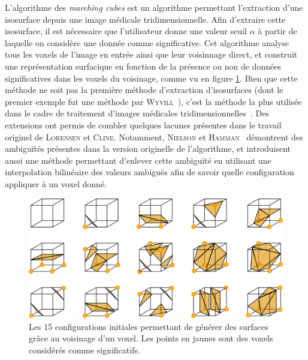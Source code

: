 {{{            L'algorithme des \textit{marching cubes} est un algorithme permettant l'extraction d'une isosurface depuis une image médicale tridimensionnelle. Afin d'extraire cette isosurface, il est nécessaire que l'utilisateur donne une valeur seuil $\alpha$ à partir de laquelle on considère une donnée comme \og{}significative\fg. Cet algorithme analyse tous les voxels de l'image en entrée ainsi que leur voisinnage direct, et construit une représentation surfacique en fonction de la présence ou non de données significatives dans les voxels du voisinage, comme vu en figure \ref{img:marching_cubes_configs}. Bien que cette méthode ne soit pas la première méthode d'extraction d'isosurfaces (dont le premier exemple fut une méthode par \textsc{Wyvill}~\cite{cite_wyvill_cubes}), c'est la méthode la plus utilisée dans le cadre de traitement d'images médicales tridimensionnelles~\cite{cite_marching_cubes_popularity}. Des extensions ont permis de combler quelques lacunes présentes dans le travail originel de \textsc{Lorensen} et \textsc{Cline}. Notamment, \textsc{Nielson} et \textsc{Hamman}~\cite{cite_marching_cubes_uncertainty} démontrent des ambiguïtés présentes dans la version originelle de l'algorithme, et introduisent aussi une méthode permettant d'enlever cette ambiguïté en utilisant une interpolation bilinéaire des valeurs ambiguës afin de savoir quelle configuration appliquer à un voxel donné.

            \begin{figure}[h]
                \centering
                \includegraphics[width=.8\linewidth]{img/marching_cubes_topology.png}
                \captionsetup{width=.8\linewidth}
                \caption{Les 15 configurations initiales permettant de générer des surfaces grâce au voisinage d'un voxel. Les points en jaunes sont des voxels considérés comme significatifs.}
                \label{img:marching_cubes_configs}
            \end{figure}

}}}
